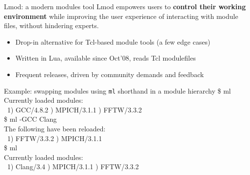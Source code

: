 \documentclass[10pt,xcolor={usenames,dvipsnames}]{beamer}
\begin{document}
\begin{frame}{Lmod: a modern modules tool}
Lmod empowers users to \textbf{control their working environment} while improving the user
experience of interacting with module files, without hindering experts.
\begin{itemize}
    \item
        Drop-in alternative for Tcl-based module tools (a few edge cases)
    \item
        Written in Lua, available since Oct'08, reads Tcl modulefiles
    \item
        Frequent releases, driven by community demands and feedback
\end{itemize}
\quad\quad
\begin{minipage}{0.9\textwidth}
    \begin{exampleblock}{Example: swapping modules using \texttt{ml} shorthand in a module hierarchy}
        \ttfamily
        \$ ml\\
        Currently loaded modules:\\
        ~1) GCC/4.8.2 ) MPICH/3.1.1 ) FFTW/3.3.2\\
        \$ ml -GCC Clang\\
        The following have been reloaded:\\
        ~1) FFTW/3.3.2 ) MPICH/3.1.1\\
        \$ ml\\
        Currently loaded modules:\\
        ~1) Clang/3.4 ) MPICH/3.1.1 ) FFTW/3.3.2
    \end{exampleblock}
\end{minipage}
\end{frame}

\end{document}
